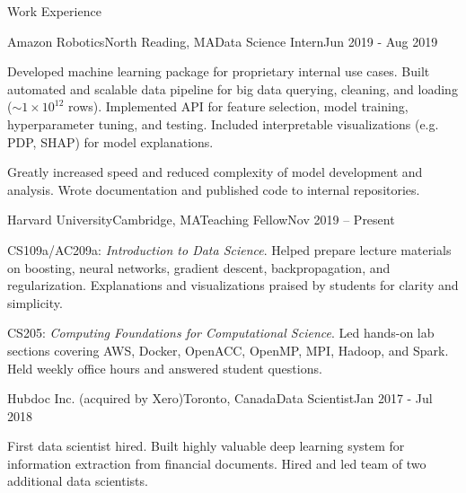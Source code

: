 \documentclass{resume} %
\begin{document}
\begin{rSection}{Work Experience}

\begin{rSubsection}{Amazon Robotics}{North Reading, MA}{Data Science Intern}{Jun 2019 - Aug 2019}

\item
    Developed machine learning package for proprietary internal use cases.
    Built automated and scalable data pipeline for big data querying, cleaning, and loading ($\sim 1 \times 10^{12}$ rows).
    Implemented API for feature selection, model training, hyperparameter tuning, and testing.
    Included interpretable visualizations (e.g. PDP, SHAP) for model explanations.

\item
    Greatly increased speed and reduced complexity of model development and analysis.
    Wrote documentation and published code to internal repositories.
    
\end{rSubsection}


\begin{rSubsection}{Harvard University}{Cambridge, MA}{Teaching Fellow}{Nov 2019 -- Present}

\item
    CS109a/AC209a: \emph{Introduction to Data Science}. Helped prepare lecture materials on boosting, neural networks, gradient descent, backpropagation, and regularization.
    Explanations and visualizations praised by students for clarity and simplicity.
    
\item
    CS205: \emph{Computing Foundations for Computational Science}. Led hands-on lab sections covering AWS, Docker, OpenACC, OpenMP, MPI, Hadoop, and Spark. Held weekly office hours and answered student questions.
    
\end{rSubsection}


\begin{rSubsection}{Hubdoc Inc. (acquired by Xero)}{Toronto, Canada}{Data Scientist}{Jan 2017 - Jul 2018}
\item
    First data scientist hired.
    Built highly valuable deep learning system for information extraction from financial documents. 
    Hired and led team of two additional data scientists.


\end{rSubsection}
\end{rSection}
\end{document}
